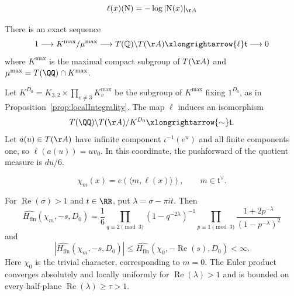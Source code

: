 \begin{equation}\label{eqn:LAsNorm} \ell(x)(\mathrm{N}) = -\log |\mathrm{N}(x)|_{\AA} \end{equation}

\begin{proposition}\label{prop:Lmap} There is an exact sequence \begin{equation} 1 \longrightarrow K^{\mathrm{max}}/\mu^{\mathrm{max}} \longrightarrow T(\mathbb Q)\backslash T(\AA) \xlongrightarrow{\ell} \mathfrak t \longrightarrow 0 \end{equation} where $K^{\mathrm{max}}$ is the maximal compact subgroup of $T(\AA)$ and $\mu^{\mathrm{max}} = T(\QQ) \cap K^{\mathrm{max}}$. \end{proposition}

\begin{lemma}\label{lemma:KprimeGroup} Let $K^{D_0}=K_{3,2}\times\prod_{v\neq3}K_v^{\mathrm{max}}$ be the subgroup of $K^{\mathrm{max}}$ fixing $1^{D_0}$, as in Proposition~\ref{prop:localIntegrality}. The map $\ell$ induces an isomorphism \begin{equation} T(\QQ)\backslash T(\AA)/K^{D_0} \xlongrightarrow{\sim} \mathfrak t. \end{equation} Let $a(u)\in T(\AA)$ have infinite component $\iota^{-1}(e^u)$ and all finite components one, so $\ell(a(u))=uv_0$. In this coordinate, the pushforward of the quotient measure is $du/6$. \end{lemma}

\begin{equation}\label{eqn:chimdefn} \chi_m(x)=e(\langle m,\ell(x)\rangle), \qquad m\in\mathfrak t^\vee. \end{equation}

\begin{lemma}\label{lemma:finiteFourierProduct} For $\operatorname{Re}(\sigma)>1$ and $t\in\RR$, put $\lambda=\sigma-\pi it$. Then \begin{equation}\label{eqn:finiteSpectralProduct} \widehat{H_{\mathrm{fin}}}(\chi_m,-s,D_0) =\frac16 \prod_{q\equiv2\pmod3}(1-q^{-2\lambda})^{-1} \prod_{p\equiv1\pmod3} \frac{1+2p^{-\lambda}}{(1-p^{-\lambda})^2} \end{equation} and \begin{equation}\label{eqn:finiteEulerBound} \left|\widehat{H_{\mathrm{fin}}}(\chi_m,-s,D_0)\right| \leq\widehat{H_{\mathrm{fin}}}(\chi_0,{-\operatorname{Re}(s)},D_0)<\infty. \end{equation} Here $\chi_0$ is the trivial character, corresponding to $m=0$. The Euler product converges absolutely and locally uniformly for $\operatorname{Re}(\lambda)>1$ and is bounded on every half-plane $\operatorname{Re}(\lambda)\geq\tau>1$. \end{lemma}

